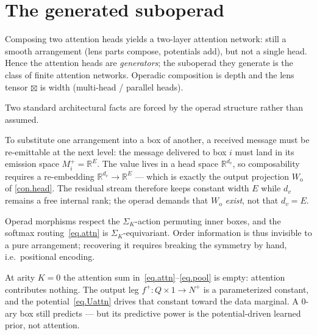 \documentclass[11pt]{article}
\theoremstyle{plain}
\theoremstyle{definition}
\theoremstyle{remark}
\newcommand{\rr}{\mathbb{R}}
\newcommand{\outp}[1]{#1^{+}}
\newcommand{\ltens}{\boxtimes}           %
\newcommand{\Wo}{W_{\mathrm o}}
\begin{document}
\section{The generated suboperad}\label{sec.suboperad}

\begin{observation}\label{obs.generate}
Composing two attention heads yields a two-layer attention network: still
a smooth arrangement (lens parts compose, potentials add), but not a
single head. Hence the attention heads are \emph{generators}; the
suboperad they generate is the class of finite attention networks.
Operadic composition is depth and the lens tensor $\ltens$ is width
(multi-head / parallel heads).
\end{observation}

Two standard architectural facts are forced by the operad structure
rather than assumed.

\begin{observation}\label{obs.residual}
To substitute one arrangement into a box of another, a received message
must be re-emittable at the next level: the message delivered to box $i$
must land in its emission space $\outp{M_i}=\rr^{E}$. The value lives in a
head space $\rr^{d_v}$, so composability requires a re-embedding
$\rr^{d_v}\to\rr^{E}$ --- which is exactly the output projection $\Wo$ of
\cref{con.head}. The residual stream therefore keeps constant width $E$
while $d_v$ remains a free internal rank; the operad demands that $\Wo$
\emph{exist}, not that $d_v=E$.
\end{observation}

\begin{observation}\label{obs.equivariance}
Operad morphisms respect the $\Sigma_K$-action permuting inner boxes, and
the softmax routing~\eqref{eq.attn} is $\Sigma_K$-equivariant. Order
information is thus invisible to a pure arrangement; recovering it requires
breaking the symmetry by hand, i.e.\ positional encoding.
\end{observation}

\begin{example}\label{ex.zeroary}
At arity $K=0$ the attention sum in~\eqref{eq.attn}--\eqref{eq.pool} is
empty: attention contributes nothing. The output leg
$\outp f\colon Q\times 1\to\outp N$ is a parameterized constant, and the
potential~\eqref{eq.Uattn} drives that constant toward the data marginal.
A $0$-ary box still predicts --- but its predictive power is the
potential-driven learned prior, not attention.
\end{example}
\end{document}
